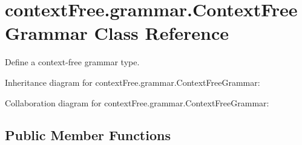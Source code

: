 \hypertarget{classcontext_free_1_1grammar_1_1_context_free_grammar}{\section{context\-Free.\-grammar.\-Context\-Free\-Grammar Class Reference}
\label{classcontext_free_1_1grammar_1_1_context_free_grammar}
}


Define a context-\/free grammar type.  




Inheritance diagram for context\-Free.\-grammar.\-Context\-Free\-Grammar\-:


Collaboration diagram for context\-Free.\-grammar.\-Context\-Free\-Grammar\-:
\subsection*{Public Member Functions}
